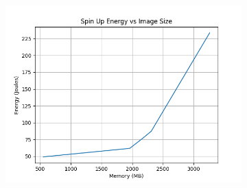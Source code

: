 \documentclass[times, 10pt,twocolumn]{article}
\begin{document}
\begin{figure}[ht]
\begin{subfigure}[b]{0.3\textwidth}
     \caption{}
     \label{fig:spin_up_mem}
   \end{subfigure}
   \hfill
   \begin{subfigure}[b]{0.3\textwidth}
      \includegraphics[width=\textwidth]{imgs/container_study/spin_up_vs_image.png}
     \caption{}
     \label{fig:spin_up_img}
   \end{subfigure}
   

\end{figure}
\end{document}
